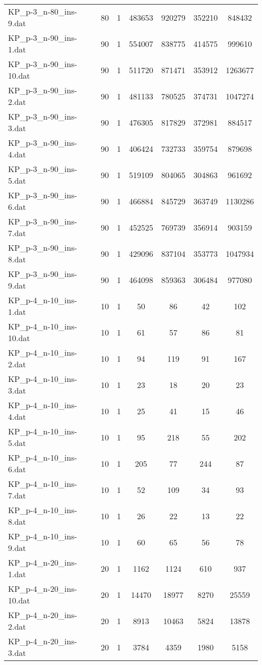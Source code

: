 \begin{table}[!ht]
\begin{tabular}{lcccccc}
KP\_p-3\_n-80\_ins-9.dat & 80 & 1 & 483653 & 920279 & 352210 & 848432 \\
KP\_p-3\_n-90\_ins-1.dat & 90 & 1 & 554007 & 838775 & 414575 & 999610 \\
KP\_p-3\_n-90\_ins-10.dat & 90 & 1 & 511720 & 871471 & 353912 & 1263677 \\
KP\_p-3\_n-90\_ins-2.dat & 90 & 1 & 481133 & 780525 & 374731 & 1047274 \\
KP\_p-3\_n-90\_ins-3.dat & 90 & 1 & 476305 & 817829 & 372981 & 884517 \\
KP\_p-3\_n-90\_ins-4.dat & 90 & 1 & 406424 & 732733 & 359754 & 879698 \\
KP\_p-3\_n-90\_ins-5.dat & 90 & 1 & 519109 & 804065 & 304863 & 961692 \\
KP\_p-3\_n-90\_ins-6.dat & 90 & 1 & 466884 & 845729 & 363749 & 1130286 \\
KP\_p-3\_n-90\_ins-7.dat & 90 & 1 & 452525 & 769739 & 356914 & 903159 \\
KP\_p-3\_n-90\_ins-8.dat & 90 & 1 & 429096 & 837104 & 353773 & 1047934 \\
KP\_p-3\_n-90\_ins-9.dat & 90 & 1 & 464098 & 859363 & 306484 & 977080 \\
KP\_p-4\_n-10\_ins-1.dat & 10 & 1 & 50 & 86 & 42 & 102 \\
KP\_p-4\_n-10\_ins-10.dat & 10 & 1 & 61 & 57 & 86 & 81 \\
KP\_p-4\_n-10\_ins-2.dat & 10 & 1 & 94 & 119 & 91 & 167 \\
KP\_p-4\_n-10\_ins-3.dat & 10 & 1 & 23 & 18 & 20 & 23 \\
KP\_p-4\_n-10\_ins-4.dat & 10 & 1 & 25 & 41 & 15 & 46 \\
KP\_p-4\_n-10\_ins-5.dat & 10 & 1 & 95 & 218 & 55 & 202 \\
KP\_p-4\_n-10\_ins-6.dat & 10 & 1 & 205 & 77 & 244 & 87 \\
KP\_p-4\_n-10\_ins-7.dat & 10 & 1 & 52 & 109 & 34 & 93 \\
KP\_p-4\_n-10\_ins-8.dat & 10 & 1 & 26 & 22 & 13 & 22 \\
KP\_p-4\_n-10\_ins-9.dat & 10 & 1 & 60 & 65 & 56 & 78 \\
KP\_p-4\_n-20\_ins-1.dat & 20 & 1 & 1162 & 1124 & 610 & 937 \\
KP\_p-4\_n-20\_ins-10.dat & 20 & 1 & 14470 & 18977 & 8270 & 25559 \\
KP\_p-4\_n-20\_ins-2.dat & 20 & 1 & 8913 & 10463 & 5824 & 13878 \\
KP\_p-4\_n-20\_ins-3.dat & 20 & 1 & 3784 & 4359 & 1980 & 5158 \\

\end{tabular}
\end{table}
